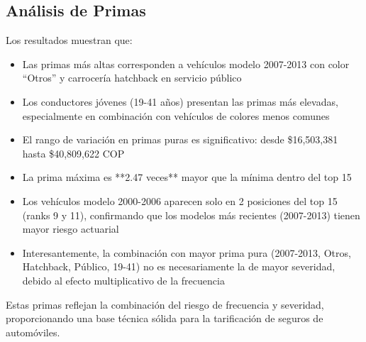 \subsection{Análisis de Primas}

Los resultados muestran que:

\begin{itemize}
\item Las primas más altas corresponden a vehículos modelo 2007-2013 con color ``Otros'' y carrocería hatchback en servicio público
\item Los conductores jóvenes (19-41 años) presentan las primas más elevadas, especialmente en combinación con vehículos de colores menos comunes
\item El rango de variación en primas puras es significativo: desde \$16,503,381 hasta \$40,809,622 COP
\item La prima máxima es **2.47 veces** mayor que la mínima dentro del top 15
\item Los vehículos modelo 2000-2006 aparecen solo en 2 posiciones del top 15 (ranks 9 y 11), confirmando que los modelos más recientes (2007-2013) tienen mayor riesgo actuarial
\item Interesantemente, la combinación con mayor prima pura (2007-2013, Otros, Hatchback, Público, 19-41) no es necesariamente la de mayor severidad, debido al efecto multiplicativo de la frecuencia
\end{itemize}

Estas primas reflejan la combinación del riesgo de frecuencia y severidad, proporcionando una base técnica sólida para la tarificación de seguros de automóviles.